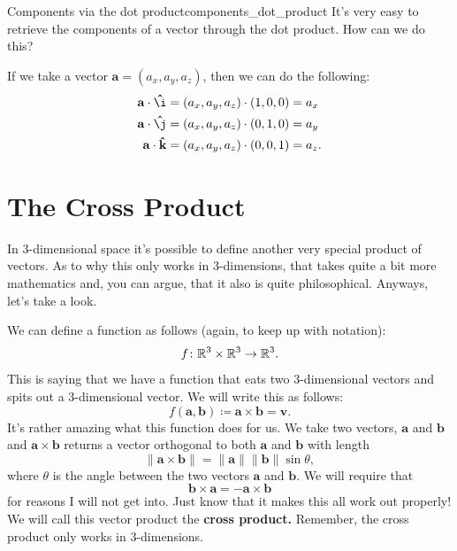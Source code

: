         \begin{ex}{Components via the dot product}{components_dot_product}
        It's very easy to retrieve the components of a vector through the dot product. How can we do this? 
        
        If we take a vector $\mathbf{a}=(a_x,a_y,a_z)$, then we can do the following:
        \begin{align*}
            \mathbf{a}\cdot \mathbf{\hat{\i}}&=(a_x,a_y,a_z)\cdot (1,0,0)=a_x\\
            \mathbf{a}\cdot \mathbf{\hat{\j}}&=(a_x,a_y,a_z)\cdot (0,1,0)=a_y\\
            \mathbf{a}\cdot \mathbf{\hat{k}}&=(a_x,a_y,a_z)\cdot (0,0,1)=a_z.
        \end{align*}
        \end{ex}
        
    \section{The Cross Product}
        In 3-dimensional space it's possible to define another very special product of vectors.  As to why this only works in 3-dimensions, that takes quite a bit more mathematics and, you can argue, that it also is quite philosophical.  Anyways, let's take a look.
        
        We can define a function as follows (again, to keep up with notation):
        \[
        f\colon \mathbb{R}^3 \times \mathbb{R}^3 \to \mathbb{R}^3.
        \]
        This is saying that we have a function that eats two 3-dimensional vectors and spits out a 3-dimensional vector. We will write this as follows:
        \[
        f(\mathbf{a},\mathbf{b})\coloneqq \mathbf{a}\times \mathbf{b} = \mathbf{v}.
        \]
        It's rather amazing what this function does for us.  We take two vectors, $\mathbf{a}$ and $\mathbf{b}$ and $\mathbf{a}\times \mathbf{b}$ returns a vector orthogonal to both $\mathbf{a}$ and $\mathbf{b}$ with length
        \[
        \|\mathbf{a}\times \mathbf{b}\|=\|\mathbf{a}\|\|\mathbf{b}\|\sin \theta,
        \]
        where $\theta$ is the angle between the two vectors $\mathbf{a}$ and $\mathbf{b}$. We will require that
        \[
        \mathbf{b}\times \mathbf{a}=-\mathbf{a}\times \mathbf{b}
        \]
        for reasons I will not get into.  Just know that it makes this all work out properly! We will call this vector product the \textbf{cross product.} Remember, the cross product only works in 3-dimensions.
        
